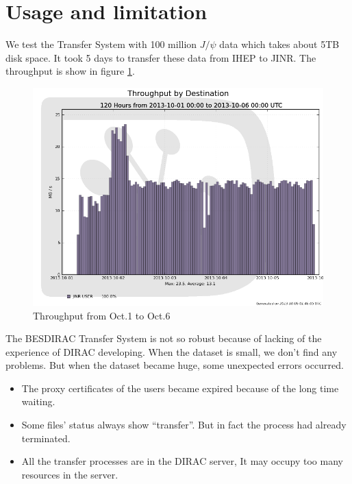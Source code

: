 \section{Usage and limitation}
We test the Transfer System with 100 million $J/\psi$ data 
which takes about 5TB disk space. It took 5 days to transfer 
these data from IHEP to JINR. The throughput is show in 
figure \ref{fig:throughput}.

\begin{figure}[htbp]
    \begin{center}
        \includegraphics[width=.8\textwidth, keepaspectratio]{data/throughput-dest-1001-10-06.png}
    \end{center}
    \caption{\label{fig:throughput}Throughput from Oct.1 to Oct.6}
\end{figure}

The BESDIRAC Transfer System is not so robust
because of lacking of the experience of DIRAC developing.
When the dataset is small, we don't find any problems.
But when the dataset became huge, some unexpected errors occurred.
\begin{itemize}
    \item The proxy certificates of the users became expired
            because of the long time waiting.
    \item Some files' status always show ``transfer''.
            But in fact the process had already terminated.
    \item All the transfer processes are in the DIRAC server,
            It may occupy too many resources in the server.
\end{itemize}

